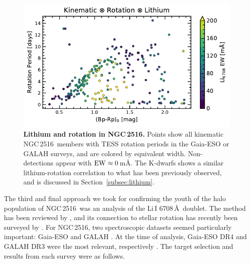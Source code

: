 \documentclass[12pt,twocolumn,tighten]{aastex63}
\newcommand{\cn}{NGC\,2516} %
\begin{document}
\begin{figure}[t]
	\begin{center}
		\leavevmode
		\includegraphics[width=1\textwidth]{f5b.pdf}
	\end{center}
	\vspace{-0.7cm}
	\caption{ {\bf Lithium and rotation in NGC\,2516.}
		Points show all kinematic \cn\ members with TESS rotation
		periods in the Gaia-ESO or GALAH surveys, and are colored by
		equivalent width.
	   Non-detections appear with ${\rm EW}\approx0\,$m\AA.
	The K-dwarfs shows a similar lithium-rotation correlation
		to what has been previously observed,
		and is discussed in Section~\ref{subsec:lithium}.
		\label{fig:lithiumrot}
	}
\end{figure}

The third and final approach we took for confirming the youth of the
halo population of \cn\ was an analysis of the Li\,\textsc{I}
6708\,\AA\ doublet.  The method has been reviewed by
\citet{soderblom_ages_2010}, and its connection to stellar rotation
has recently been surveyed by \citet{bouvier_lithium-rotation_2020}.
For \cn, two spectroscopic datasets seemed particularly important:
Gaia-ESO \citep{gilmore_gaiaeso_2012} and GALAH
\citep{silva_galah_2015}.  At the time of analysis, Gaia-ESO DR4 and
GALAH DR3 were the most relevant, respectively \citep[{\it
e.g.},][]{randich_gaiaeso_2018,buder_galah_2020}.  The target
selection and results from each survey were as follows.
\end{document}
